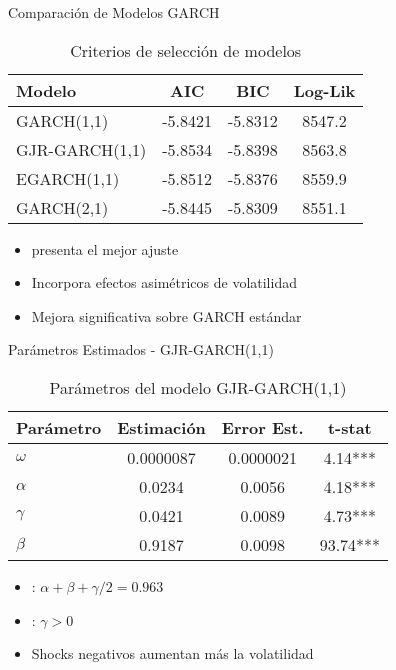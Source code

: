 \begin{frame}{Comparación de Modelos GARCH}
    \begin{table}
        \centering
        \footnotesize
        \begin{tabular}{lccc}
            \toprule
            \textbf{Modelo} & \textbf{AIC} & \textbf{BIC} & \textbf{Log-Lik} \\
            \midrule
            GARCH(1,1) & -5.8421 & -5.8312 & 8547.2 \\
            GJR-GARCH(1,1) & -5.8534 & -5.8398 & 8563.8 \\
            EGARCH(1,1) & -5.8512 & -5.8376 & 8559.9 \\
            GARCH(2,1) & -5.8445 & -5.8309 & 8551.1 \\
            \bottomrule
        \end{tabular}
        \caption{Criterios de selección de modelos}
    \end{table}
    
    \vspace{0.5em}
    
    \begin{itemize}
        \item<2->  presenta el mejor ajuste
        \item<3-> Incorpora efectos asimétricos de volatilidad
        \item<4-> Mejora significativa sobre GARCH estándar
    \end{itemize}
\end{frame}

\begin{frame}{Parámetros Estimados - GJR-GARCH(1,1)}
    \begin{table}
        \centering
        \begin{tabular}{lccc}
            \toprule
            \textbf{Parámetro} & \textbf{Estimación} & \textbf{Error Est.} & \textbf{t-stat} \\
            \midrule
            $\omega$ & 0.0000087 & 0.0000021 & 4.14*** \\
            $\alpha$ & 0.0234 & 0.0056 & 4.18*** \\
            $\gamma$ & 0.0421 & 0.0089 & 4.73*** \\
            $\beta$ & 0.9187 & 0.0098 & 93.74*** \\
            \bottomrule
        \end{tabular}
        \caption{Parámetros del modelo GJR-GARCH(1,1)}
    \end{table}
    
    \vspace{0.5em}
    
    \begin{itemize}
        \item<2-> : $\alpha + \beta + \gamma/2 = 0.963$
        \item<3-> : $\gamma > 0$
        \item<4-> Shocks negativos aumentan más la volatilidad
    \end{itemize}
\end{frame}